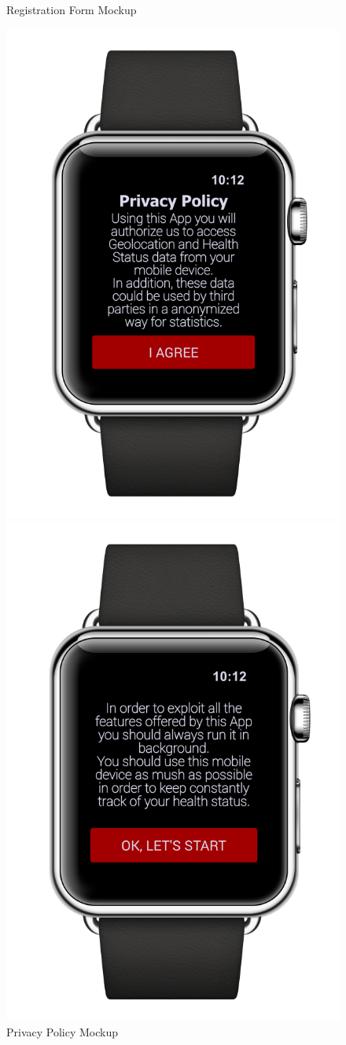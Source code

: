 \begin{enumerate}
\begin{figure}[H]
\begin{center}
\begin{minipage}[c]{.40\textwidth}
	\caption{Registration Form  Mockup}
        \end{minipage}
      \end{center}
\end{figure}
\clearpage
\begin{figure}[H]
\begin{center}
        \begin{minipage}[c]{.40\textwidth}
	\centering
          \includegraphics[height=9.5  cm]{Images/Mockups/AutomatedSOSMockup2.png}
	\caption{Privacy Policy Mockup}
        \end{minipage}%
        \hspace{10mm}%
        \begin{minipage}[c]{.40\textwidth}
	\centering
          \includegraphics[height=9.5 cm]{Images/Mockups/AutomatedSOSMockup4.png}

\end{minipage}
\end{center}
\end{figure}
\end{enumerate}
